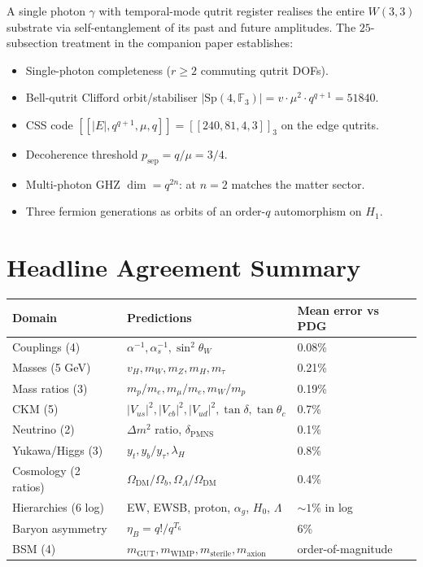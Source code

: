 \documentclass[11pt]{article}
\newcommand{\GF}[1]{\mathbb{F}_{#1}}
\newcommand{\W}{W(3,3)}
\newcommand{\Sp}{\mathrm{Sp}}
\begin{document}
A single photon $\gamma$ with temporal-mode qutrit register realises
the entire $\W$ substrate via self-entanglement of its past and
future amplitudes.  The $25$-subsection treatment in the companion
paper \cite{single_photon_paper} establishes:
\begin{itemize}[noitemsep]
  \item Single-photon completeness ($r \ge 2$ commuting qutrit DOFs).
  \item Bell-qutrit Clifford orbit/stabiliser
    $|\Sp(4,\GF{3})| = v \cdot \mu^2 \cdot q^{q+1} = 51840$.
  \item CSS code $[[|E|, q^{q+1}, \mu, q]] = [[240, 81, 4, 3]]_3$ on the edge qutrits.
  \item Decoherence threshold $p_{\mathrm{sep}} = q/\mu = 3/4$.
  \item Multi-photon GHZ $\dim = q^{2n}$: at $n=2$ matches the matter sector.
  \item Three fermion generations as orbits of an order-$q$ automorphism on $H_1$.
\end{itemize}

\section{Headline Agreement Summary}

\begin{center}\small\begin{tabular}{lll}
\toprule
\textbf{Domain} & \textbf{Predictions} & \textbf{Mean error vs PDG} \\
\midrule
Couplings (4)         & $\alpha^{-1}, \alpha_s^{-1}, \sin^2\theta_W$ & 0.08\% \\
Masses (5 GeV)        & $v_H, m_W, m_Z, m_H, m_\tau$               & 0.21\% \\
Mass ratios (3)       & $m_p/m_e, m_\mu/m_e, m_W/m_p$              & 0.19\% \\
CKM (5)               & $|V_{us}|^2, |V_{cb}|^2, |V_{ud}|^2, \tan\delta, \tan\theta_c$ & 0.7\% \\
Neutrino (2)          & $\Delta m^2$ ratio, $\delta_{\mathrm{PMNS}}$ & 0.1\% \\
Yukawa/Higgs (3)      & $y_t, y_b/y_\tau, \lambda_H$               & 0.8\% \\
Cosmology (2 ratios)  & $\Omega_{\mathrm{DM}}/\Omega_b, \Omega_\Lambda/\Omega_{\mathrm{DM}}$ & 0.4\% \\
Hierarchies (6 log)   & EW, EWSB, proton, $\alpha_g$, $H_0$, $\Lambda$ & $\sim 1$\% in log \\
Baryon asymmetry      & $\eta_B = q!/q^{T_6}$                       & 6\% \\
BSM (4)               & $m_{\mathrm{GUT}}, m_{\mathrm{WIMP}}, m_{\mathrm{sterile}}, m_{\mathrm{axion}}$ & order-of-magnitude \\
\bottomrule
\end{tabular}\end{center}
\end{document}

